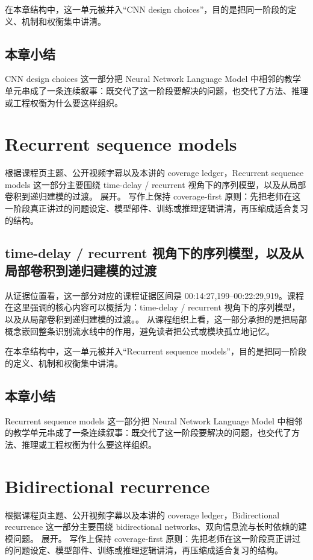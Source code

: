\documentclass[a4paper]{article}
\begin{document}
在本章结构中，这一单元被并入“CNN design choices”，目的是把同一阶段的定义、机制和权衡集中讲清。

\subsection{本章小结}
CNN design choices 这一部分把 Neural Network Language Model 中相邻的教学单元串成了一条连续叙事：既交代了这一阶段要解决的问题，也交代了方法、推理或工程权衡为什么要这样组织。

\section{Recurrent sequence models}
根据课程页主题、公开视频字幕以及本讲的 coverage ledger，Recurrent sequence models 这一部分主要围绕 time-delay / recurrent 视角下的序列模型，以及从局部卷积到递归建模的过渡。 展开。
写作上保持 coverage-first 原则：先把老师在这一阶段真正讲过的问题设定、模型部件、训练或推理逻辑讲清，再压缩成适合复习的结构。

\subsection{time-delay / recurrent 视角下的序列模型，以及从局部卷积到递归建模的过渡}
从证据位置看，这一部分对应的课程证据区间是 00:14:27,199--00:22:29,919。课程在这里强调的核心内容可以概括为：time-delay / recurrent 视角下的序列模型，以及从局部卷积到递归建模的过渡。。
从课程组织上看，这一部分承担的是把局部概念嵌回整条识别流水线中的作用，避免读者把公式或模块孤立地记忆。

在本章结构中，这一单元被并入“Recurrent sequence models”，目的是把同一阶段的定义、机制和权衡集中讲清。

\subsection{本章小结}
Recurrent sequence models 这一部分把 Neural Network Language Model 中相邻的教学单元串成了一条连续叙事：既交代了这一阶段要解决的问题，也交代了方法、推理或工程权衡为什么要这样组织。

\section{Bidirectional recurrence}
根据课程页主题、公开视频字幕以及本讲的 coverage ledger，Bidirectional recurrence 这一部分主要围绕 bidirectional networks、双向信息流与长时依赖的建模问题。 展开。
写作上保持 coverage-first 原则：先把老师在这一阶段真正讲过的问题设定、模型部件、训练或推理逻辑讲清，再压缩成适合复习的结构。
\end{document}
